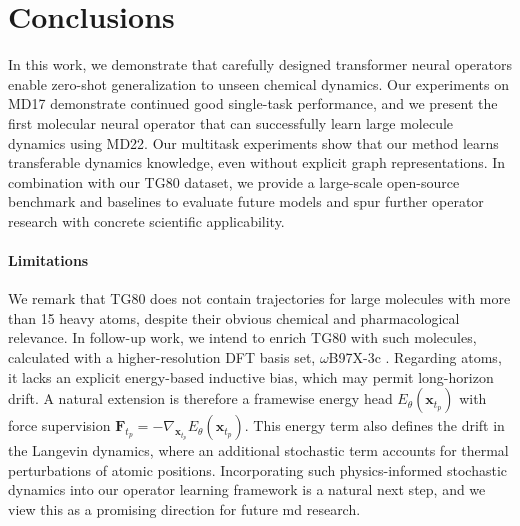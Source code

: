\section{Conclusions}

In this work, we demonstrate that carefully designed transformer neural operators enable zero-shot generalization to unseen chemical dynamics. Our experiments on MD17 demonstrate continued good single-task performance, and we present the first molecular neural operator that can successfully learn large molecule dynamics using MD22. Our multitask experiments show that our method learns transferable dynamics knowledge, even without explicit graph representations. In combination with our TG80 dataset, we provide a large-scale open-source benchmark and baselines to evaluate future models and spur further operator research with concrete scientific applicability.


\paragraph{Limitations} We remark that TG80 does not contain trajectories for large molecules with more than 15 heavy atoms, despite their obvious chemical and pharmacological relevance. In follow-up work, we intend to enrich TG80 with such molecules, calculated with a higher-resolution DFT basis set, \(\omega\)B97X-3c \cite{muller_omegab97x-3c_2023}. Regarding \gls{atoms}, it lacks an explicit energy-based inductive bias, which may permit long-horizon drift. A natural extension is therefore a framewise energy head \(E_\theta(\mathbf{x}_{t_p})\) with force supervision \(\mathbf{F}_{t_p}=-\nabla_{\mathbf{x}_{t_p}}E_\theta(\mathbf{x}_{t_p})\). {This energy term also defines the drift in the Langevin dynamics, where an additional stochastic term accounts for thermal perturbations of atomic positions. Incorporating such physics-informed stochastic dynamics into our operator learning framework is a natural next step, and we view this as a promising direction for future \gls{md} research.}




